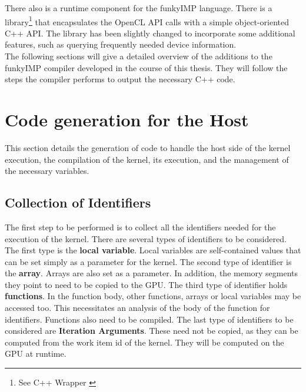 There also is a runtime component for the funkyIMP language. There is a library\footnote{See C++ Wrapper \cite{medina2013wrapper}} that encapsulates the OpenCL API calls with a simple object-oriented C++ API. The library has been slightly changed to incorporate some additional features, such as querying frequently needed device information. \\

The following sections will give a detailed overview of the additions to the funkyIMP compiler developed in the course of this thesis. They will follow the steps the compiler performs to output the necessary C++ code. 
\newpage



\section{Code generation for the Host}
\label{sect:compiler_code}
This section details the generation of code to handle the host side of the kernel execution, the compilation of the kernel, its execution, and the management of the necessary variables. 

\subsection{Collection of Identifiers}
\label{sect:compiler_code_identifiers}
The first step to be performed is to collect all the identifiers needed for the execution of the kernel. There are several types of identifiers to be considered. The first type is the \textbf{local variable}. Local variables are self-contained values that can be set simply as a parameter for the kernel. The second type of identifier is the \textbf{array}. Arrays are also set as a parameter. In addition, the memory segments they point to need to be copied to the GPU. The third type of identifier holds \textbf{functions}. In the function body, other functions, arrays or local variables may be accessed too. This necessitates an analysis of the body of the function for identifiers. Functions also need to be compiled. The last type of identifiers to be considered are \textbf{Iteration Arguments}. These need not be copied, as they can be computed from the work item id of the kernel. They will be computed on the GPU at runtime.\\

